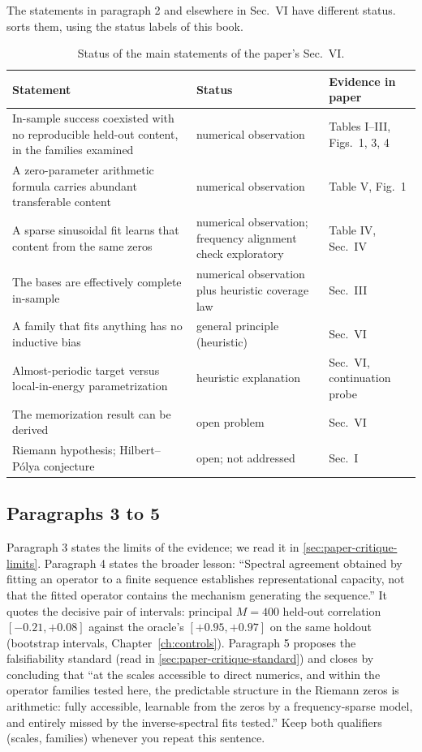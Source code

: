 The statements in paragraph 2 and elsewhere in Sec.~VI have different status.  sorts them, using the status labels of this book.

\begin{table}[htbp]\centering\small
\caption{Status of the main statements of the paper's Sec.~VI.}
\label{tab:paper-critique-status}
\begin{tabular}{p{6.3cm}p{3.2cm}p{3.0cm}}
\toprule
Statement & Status & Evidence in paper \\
\midrule
In-sample success coexisted with no reproducible held-out content, in the families examined & numerical observation & Tables I--III, Figs.~1, 3, 4 \\
A zero-parameter arithmetic formula carries abundant transferable content & numerical observation & Table V, Fig.~1 \\
A sparse sinusoidal fit learns that content from the same zeros & numerical observation; frequency alignment check exploratory & Table IV, Sec.~IV \\
The bases are effectively complete in-sample & numerical observation plus heuristic coverage law & Sec.~III \\
A family that fits anything has no inductive bias & general principle (heuristic) & Sec.~VI \\
Almost-periodic target versus local-in-energy parametrization & heuristic explanation & Sec.~VI, continuation probe \\
The memorization result can be derived & open problem & Sec.~VI \\
Riemann hypothesis; Hilbert--P\'olya conjecture & open; not addressed & Sec.~I \\
\bottomrule
\end{tabular}
\end{table}

\subsection{Paragraphs 3 to 5}

Paragraph 3 states the limits of the evidence; we read it in \cref{sec:paper-critique-limits}. Paragraph 4 states the broader lesson: ``Spectral agreement obtained by fitting an operator to a finite sequence establishes representational capacity, not that the fitted operator contains the mechanism generating the sequence.'' It quotes the decisive pair of intervals: principal $M=400$ held-out correlation $[-0.21,+0.08]$ against the oracle's $[+0.95,+0.97]$ on the same holdout (bootstrap intervals, Chapter~\ref{ch:controls}). Paragraph 5 proposes the falsifiability standard (read in \cref{sec:paper-critique-standard}) and closes by concluding that ``at the scales accessible to direct numerics, and within the operator families tested here, the predictable structure in the Riemann zeros is arithmetic: fully accessible, learnable from the zeros by a frequency-sparse model, and entirely missed by the inverse-spectral fits tested.'' Keep both qualifiers (scales, families) whenever you repeat this sentence.

